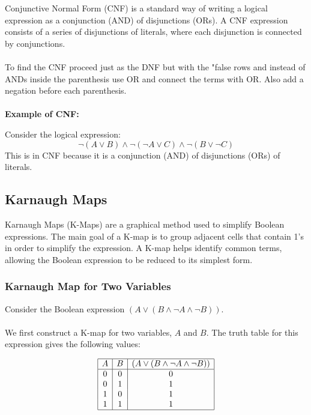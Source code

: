 Conjunctive Normal Form (CNF) is a standard way of writing a logical expression as a conjunction (AND)
of disjunctions (ORs). A CNF expression consists of a series of disjunctions of
literals, where each disjunction is connected by conjunctions.
\\\\
To find the CNF proceed just as the DNF but with the "false rows and instead
of ANDs inside the parenthesis use OR and connect the terms with OR. Also add a negation before each parenthesis.
\\\\
\textbf{Example of CNF:}

Consider the logical expression:
\[
	\neg (A \lor B) \land \neg (\neg A \lor C) \land \neg (B \lor \neg C)
\]
This is in CNF because it is a conjunction (AND) of disjunctions (ORs) of literals.

\subsection{Karnaugh Maps}

Karnaugh Maps (K-Maps) are a graphical method used to simplify Boolean expressions. The main goal of a K-map is to group adjacent cells that contain 1's in order to simplify the expression. A K-map helps identify common terms, allowing the Boolean expression to be reduced to its simplest form.

\subsubsection*{Karnaugh Map for Two Variables}

Consider the Boolean expression \( (A \lor (B \land \neg A \land \neg B)) \).
\\\\
We first construct a K-map for two variables, \( A \) and \( B \). The truth table for this expression gives the following values:

\[
	\begin{array}{|c|c|c|}
		\hline
		A & B & (A \lor (B \land \neg A \land \neg B)) \\
		\hline
		0 & 0 & 0                                      \\
		0 & 1 & 1                                      \\
		1 & 0 & 1                                      \\
		1 & 1 & 1                                      \\
		\hline
	\end{array}
\]

